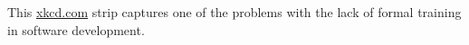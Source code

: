 \label{fig:xkcd}

This \href{https://xkcd.com/1513/}{xkcd.com} strip captures one of the problems with the lack of formal training in software development.
  
  
  
  
  
  
